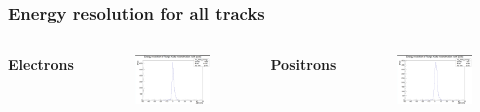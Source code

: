 \documentclass{beamer}
\begin{document}
		\begin{frame}
			\frametitle{Energy resolution for all tracks}
			\begin{columns}
				\centering
				\Large \textbf{Electrons}
				\begin{figure}
					\centering
					\includegraphics[width = 0.95 \linewidth]{images/c_e_delta_energy.png}
				\end{figure}
				\centering
				\Large \textbf{Positrons}
				\begin{figure}
					\centering
					\includegraphics[width = 0.95 \linewidth]{images/c_p_delta_energy.png}
				\end{figure}
			\end{columns}
		\end{frame}
\end{document}
